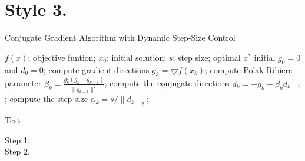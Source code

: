\documentclass[UTF8]{article}
\begin{document}
\section{Style 3.}

\begin{algorithm}[h]
\caption{Conjugate Gradient Algorithm with Dynamic Step-Size Control}
\label{alg::conjugateGradient}
\begin{algorithmic}[1]
\Require
$f(x)$: objective funtion;
$x_0$: initial solution;
$s$: step size;
\Ensure
optimal $x^{*}$
\State initial $g_0=0$ and $d_0=0$;
\Repeat
\State compute gradient directions $g_k=\bigtriangledown f(x_k)$;
\State compute Polak-Ribiere parameter $\beta_k=\frac{g_k^{T}(g_k-g_{k-1})}{\parallel g_{k-1} \parallel^{2}}$;
\State compute the conjugate directions $d_k=-g_k+\beta_k d_{k-1}$;
\State compute the step size $\alpha_k=s/\parallel d_k \parallel_{2}$;
\end{algorithmic}
\end{algorithm}


\iffalse
\section{Style 4.}
\usepackage[linesnumbered,boxed]{algorithm2e}

\begin{algorithm}
\caption{identifyRowContext}
\KwIn{$r_i$, $Backgrd(T_i)$=${T_1,T_2,\ldots ,T_n}$ and similarity threshold $\theta_r$}
\KwOut{$con(r_i)$}
$con(r_i)= \Phi$\;
\For{$j=1;j \le n;j \ne i$}
{
float $maxSim=0$\;
$r^{maxSim}=null$\;
\While{not end of $T_j$}
{
compute Jaro($r_i,r_m$)($r_m\in T_j$)\;
\If{$(Jaro(r_i,r_m) \ge \theta_r)\wedge (Jaro(r_i,r_m)\ge r^{maxSim})$}
{
replace $r^{maxSim}$ with $r_m$\;
}
}
$con(r_i)=con(r_i)\cup {r^{maxSim}}$\;
}
return $con(r_i)$\;
\end{algorithm}

如果想要去掉算法中的竖线:

在\begin{algorithm}之后加入\SetAlgoNoLine

\fi

\begin{algorithm}[h]
\caption{Test}
\begin{algorithmic}[1]

\begin{description}
  \item[Step 1.]
  \item[Step 2.]
\end{description}

\end{algorithmic}
\end{algorithm}
\end{document}
